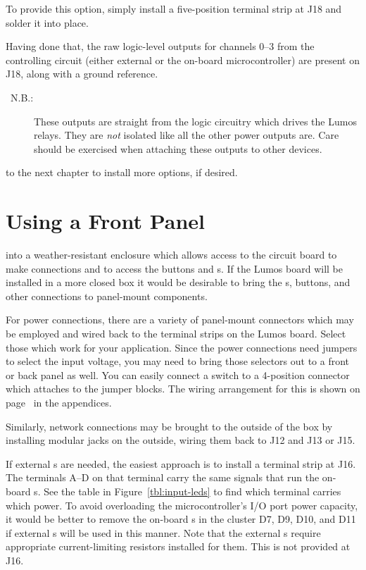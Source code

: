 \documentclass[letterpaper,twoside,onecolumn,openright,final]{memoir}
\begin{document}
To provide this option, simply install a five-position terminal strip at J18 and solder it
into place.

Having done that, the raw logic-level outputs for channels 0--3 from the controlling 
circuit (either external or the on-board microcontroller) are present on J18, along with a ground
reference.

\begin{description}
\item[\HandRight\ N.B.:] These outputs are straight from the logic circuitry which drives the
Lumos relays.  They are \emph{not} isolated like all the other power outputs are.  Care should
be exercised when attaching these outputs to other devices.
\end{description}

\bigskip{} to the next chapter to install more options, if desired.

\chapter{Using a Front Panel}\label{ch:fp}
 into a weather-resistant enclosure which allows access
to the circuit board to make connections and to access the buttons and s.  If the Lumos
board will be installed in a more closed box it would be desirable to bring the s, buttons,
and other connections to panel-mount components.

For power connections, there are a variety of panel-mount connectors which may be employed and wired
back to the terminal strips on the Lumos board.  Select those which work for your application.
Since the power connections need jumpers to select the input voltage, you may need to bring those
selectors out to a front or back panel as well.  You can easily connect a  switch
to a 4-position connector which attaches to the jumper blocks.  The wiring arrangement for this 
is shown on page~\pageref{sec:voltagesw} in the appendices.

Similarly, network connections may be brought to the outside of the box by installing modular jacks
on the outside, wiring them back to J12 and J13 or J15. 

If external s are needed, the easiest approach is to install a terminal strip at J16.
The terminals A--D on that terminal carry the same signals that run the on-board s.
See the table in Figure~\ref{tbl:input-leds} to find which terminal carries which  power.
To avoid overloading the microcontroller's I/O port power capacity, it would be better to remove the
on-board s in the cluster D7, D9, D10, and D11 if external s will be used
in this manner.  Note that the external s require appropriate current-limiting resistors
installed for them.  This is not provided at J16.
\end{document}
